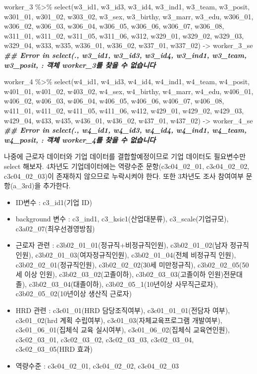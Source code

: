 \documentclass[
]{book}
\newenvironment{Shaded}{\begin{snugshade}}{\end{snugshade}}
\newcommand{\DocumentationTok}[1]{\textcolor[rgb]{0.56,0.35,0.01}{\textbf{\textit{#1}}}}
\newcommand{\FunctionTok}[1]{\textcolor[rgb]{0.00,0.00,0.00}{#1}}
\newcommand{\NormalTok}[1]{#1}
\newcommand{\OtherTok}[1]{\textcolor[rgb]{0.56,0.35,0.01}{#1}}
\newcommand{\SpecialCharTok}[1]{\textcolor[rgb]{0.00,0.00,0.00}{#1}}
\providecommand{\tightlist}{%
  \setlength{\itemsep}{0pt}\setlength{\parskip}{0pt}}
\theoremstyle{definition}
\theoremstyle{definition}
\theoremstyle{definition}
\theoremstyle{definition}
\theoremstyle{remark}
\begin{document}
\begin{Shaded}
\begin{Highlighting}[]
\NormalTok{worker\_3 }\SpecialCharTok{\%\textgreater{}\%} 
  \FunctionTok{select}\NormalTok{(w3\_id1, w3\_id3, w3\_id4, w3\_ind1, w3\_team, w3\_posit, w301\_01, w301\_02, w303\_02, w3\_sex, w3\_birthy, w3\_marr, w3\_edu, w306\_01, w306\_02, w306\_03, w306\_04, w306\_05, w306\_06, w306\_07, w306\_08, w311\_01, w311\_02, w311\_05, w311\_06, w312, w329\_01, w329\_02, w329\_03, w329\_04, w333, w335, w336\_01, w336\_02, w337\_01, w337\_02) }\OtherTok{{-}\textgreater{}}\NormalTok{ worker\_3\_se}
\DocumentationTok{\#\# Error in select(., w3\_id1, w3\_id3, w3\_id4, w3\_ind1, w3\_team, w3\_posit, : 객체 \textquotesingle{}worker\_3\textquotesingle{}를 찾을 수 없습니다}

\NormalTok{worker\_4 }\SpecialCharTok{\%\textgreater{}\%} 
  \FunctionTok{select}\NormalTok{(w4\_id1, w4\_id3, w4\_id4, w4\_ind1, w4\_team, w4\_posit, w401\_01, w401\_02, w403\_02, w4\_sex, w4\_birthy, w4\_marr, w4\_edu, w406\_01, w406\_02, w406\_03, w406\_04, w406\_05, w406\_06, w406\_07, w406\_08, w411\_01, w411\_02, w411\_05, w411\_06, w412, w429\_01, w429\_02, w429\_03, w429\_04, w433, w435, w436\_01, w436\_02, w437\_01, w437\_02) }\OtherTok{{-}\textgreater{}}\NormalTok{ worker\_4\_se}
\DocumentationTok{\#\# Error in select(., w4\_id1, w4\_id3, w4\_id4, w4\_ind1, w4\_team, w4\_posit, : 객체 \textquotesingle{}worker\_4\textquotesingle{}를 찾을 수 없습니다}
\end{Highlighting}
\end{Shaded}

나중에 근로자 데이터와 기업 데이터를 결합할예정이므로 기업 데이터도 필요변수만 select 해보자. 4차년도 기업데이터에는 역량수준 문항(c3c04\_02\_01, c3c04\_02\_02, c3c04\_02\_03)이 존재하지 않으므로 누락시켜야 한다. 또한 3차년도 조사 참여여부 문항(a\_3rd)을 추가한다.

\begin{itemize}
\tightlist
\item
  ID변수 : c3\_id1(기업 ID)
\item
  background 변수 : c3\_ind1, c3\_ksic1(산업대분류), c3\_scale(기업규모), c3a02\_07(최우선경영방침)
\item
  근로자 관련 : c3b02\_01\_01(정규직+비정규직인원), c3b02\_01\_02(남자 정규직인원), c3b02\_01\_03(여자정규직인원), c3b02\_01\_04(전체 비정규직 인원), c3b02\_02\_01(정규직인원), c3b02\_02\_02(30세 미만정규직), c3b02\_02\_05(50세 이상 인원), c3b02\_03\_02(고졸이하), c3b02\_03\_03(고졸이하 인원)전문대졸), c3b02\_03\_04(대졸이하), c3b02\_05\_1(10년이상 사무직근로자), c3b02\_05\_02(10년이상 생산직 근로자)
\item
  HRD 관련 : c3c01\_01(HRD 담당조직여부), c3c01\_01\_01(전담자 여부), c3c01\_02(hrd 계획 수립여부), c3c01\_03(자체교육프로그램 개발여부), c3c01\_06\_01(집체식 교육 실시여부), c3c01\_06\_02(집체식 교육연인원), c3c02\_03\_01, c3c02\_03\_02, c3c02\_03\_03, c3c02\_03\_04, c3c02\_03\_05(HRD 효과)
\item
  역량수준 : c3c04\_02\_01, c3c04\_02\_02, c3c04\_02\_03
\end{itemize}
\end{document}
